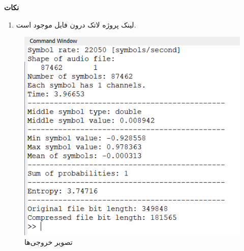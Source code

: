 \textbf{\Huge نکات}
\vspace{.5 cm}

\Large
\begin{enumerate}
    \item لینک پروژه لاتک درون فایل  موجود است.
\end{enumerate}

\begin{figure}[H]
    \includegraphics[]{Images/Outputs.png}
    \centering
    \caption{تصویر خروجی‌ها}
\end{figure}